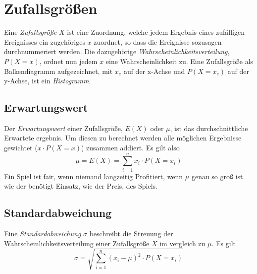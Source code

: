 \documentclass{article}
\begin{document}
\section{Zufallsgrößen} 
Eine \emph{Zufallsgröße} $X$ ist eine Zuordnung, welche jedem Ergebnis eines zufälligen Ereignisses ein zugehöriges $x$ zuordnet, so dass die Ereignisse sozusagen durchnummeriert werden. Die dazugehörige \emph{Wahrscheinlichkeitsverteilung}, $P(X=x)$, ordnet nun jedem $x$ eine Wahrscheinlichkeit zu. \newline
Eine Zufallsgröße als Balkendiagramm aufgezeichnet, mit $x_e$ auf der x-Achse und $P(X=x_e)$ auf der y-Achse, ist ein \emph{Histogramm}.
 
\subsection{Erwartungswert}
Der \emph{Erwartungswert} einer Zufallsgröße, $E(X)$ oder $\mu$, ist das durchschnittliche Erwartete ergebnis. Um diesen zu berechnet werden alle möglichen Ergebnisse gewichtet ($x \cdot P(X=x)$) zusammen addiert. Es gilt also
\[
 \mu = E(X) = \sum_{i=1}^n x_i \cdot P(X=x_i) 
\]  
Ein Spiel ist fair, wenn niemand langzeitig Profitiert, wenn $\mu$ genau so groß ist wie der benötigt Einsatz, wie der Preis, des Spiels.
 
\subsection{Standardabweichung}
Eine \emph{Standardabweichung} $\sigma$ beschreibt die Streuung der Wahrscheinlichkeitsverteilung einer Zufallsgröße $X$ im vergleich zu $\mu$. Es gilt
\[
 \sigma = \sqrt{\sum_{i=1}^n (x_i - \mu)^2 \cdot P(X=x_i)}
\]
 
\end{document}
